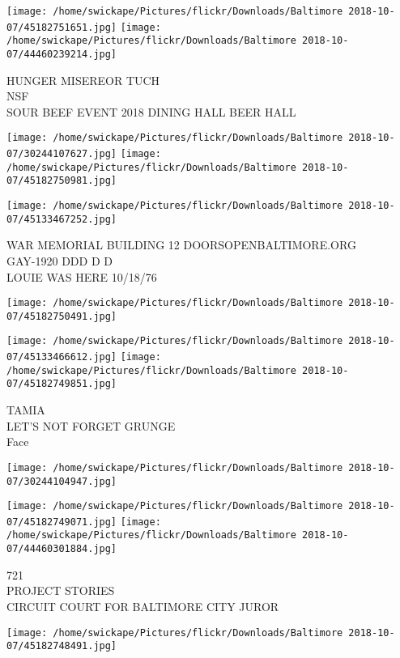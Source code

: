 \documentclass[10pt,letterpaper]{article}
\begin{document}
\vspace{0.25in}
\texttt{[image: /home/swickape/Pictures/flickr/Downloads/Baltimore 2018-10-07/45182751651.jpg]}
\texttt{[image: /home/swickape/Pictures/flickr/Downloads/Baltimore 2018-10-07/44460239214.jpg]}

HUNGER MISEREOR TUCH\\
NSF\\
SOUR BEEF EVENT 2018 DINING HALL BEER HALL
\pagebreak

\texttt{[image: /home/swickape/Pictures/flickr/Downloads/Baltimore 2018-10-07/30244107627.jpg]}
\texttt{[image: /home/swickape/Pictures/flickr/Downloads/Baltimore 2018-10-07/45182750981.jpg]}

\texttt{[image: /home/swickape/Pictures/flickr/Downloads/Baltimore 2018-10-07/45133467252.jpg]}

WAR MEMORIAL BUILDING 12 DOORSOPENBALTIMORE.ORG\\
GAY{-}1920 DDD D D\\
LOUIE WAS HERE 10/18/76
\pagebreak

\texttt{[image: /home/swickape/Pictures/flickr/Downloads/Baltimore 2018-10-07/45182750491.jpg]}

\vspace{0.25in}
\texttt{[image: /home/swickape/Pictures/flickr/Downloads/Baltimore 2018-10-07/45133466612.jpg]}
\texttt{[image: /home/swickape/Pictures/flickr/Downloads/Baltimore 2018-10-07/45182749851.jpg]}

TAMIA\\
LET'S NOT FORGET GRUNGE\\
Face
\pagebreak

\texttt{[image: /home/swickape/Pictures/flickr/Downloads/Baltimore 2018-10-07/30244104947.jpg]}

\vspace{0.25in}
\texttt{[image: /home/swickape/Pictures/flickr/Downloads/Baltimore 2018-10-07/45182749071.jpg]}
\texttt{[image: /home/swickape/Pictures/flickr/Downloads/Baltimore 2018-10-07/44460301884.jpg]}

721\\
PROJECT STORIES\\
CIRCUIT COURT FOR BALTIMORE CITY JUROR
\pagebreak

\texttt{[image: /home/swickape/Pictures/flickr/Downloads/Baltimore 2018-10-07/45182748491.jpg]}
\end{document}
